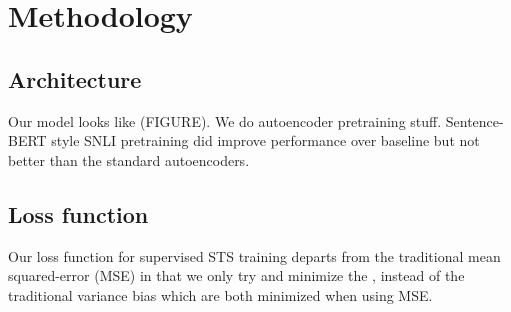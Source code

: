 \documentclass[14pt]{article}
\begin{document}

\section{Methodology}
\subsection{Architecture}
Our model looks like (FIGURE). We do autoencoder pretraining stuff. Sentence-BERT style SNLI pretraining did improve performance over baseline but not better than the standard autoencoders.


\subsection{Loss function}
Our loss function for supervised STS training departs from the traditional mean squared-error (MSE) in that we only try and minimize the , instead of the traditional variance  bias which are both minimized when using MSE.
\end{document}

